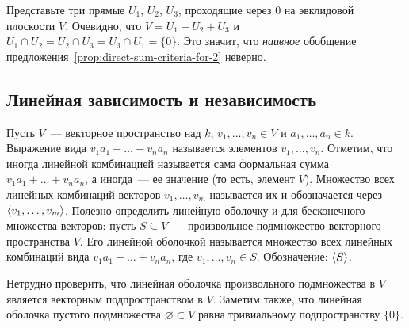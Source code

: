 \begin{remark}
Представьте три прямые $U_1$, $U_2$, $U_3$, проходящие через $0$
на эвклидовой плоскости $V$. Очевидно, что $V = U_1 + U_2 + U_3$
и $U_1\cap U_2 = U_2\cap U_3 = U_3\cap U_1 = \{0\}$.
Это значит, что {\em наивное} обобщение предложения~\ref{prop:direct-sum-criteria-for-2}
неверно.
\end{remark}


\subsection{Линейная зависимость и независимость}

\begin{definition}\label{dfn:linear-combination-and-span}
Пусть $V$~--- векторное пространство над $k$, $v_1,\dots,v_n\in V$ и
$a_1,\dots,a_n\in k$. Выражение вида
$v_1a_1+\dots+v_na_n$ называется  элементов
$v_1,\dots,v_n$. Отметим, что иногда линейной
комбинацией называется сама формальная сумма
$v_1a_1+\dots+v_na_n$, а иногда~--- ее значение (то есть,
элемент $V$).
Множество всех линейных комбинаций векторов $v_1,\dots,v_m$
называется их  и обозначается
через $\langle v_1,\dots,v_m\rangle$.
Полезно определить линейную оболочку и для бесконечного множества векторов:
пусть $S\subseteq V$~--- произвольное подмножество векторного
пространства $V$. Его линейной оболочкой называется
множество всех линейных комбинаций вида $v_1a_1 + \dots + v_na_n$,
где $v_1,\dots,v_n\in S$. Обозначение: $\langle S\rangle$.
\end{definition}
\begin{remark}
Нетрудно проверить, что линейная оболочка произвольного подмножества
в $V$ является векторным подпространством в $V$.
Заметим также, что линейная оболочка пустого подмножества
$\varnothing\subset V$ равна тривиальному подпространству $\{0\}$.
\end{remark}

